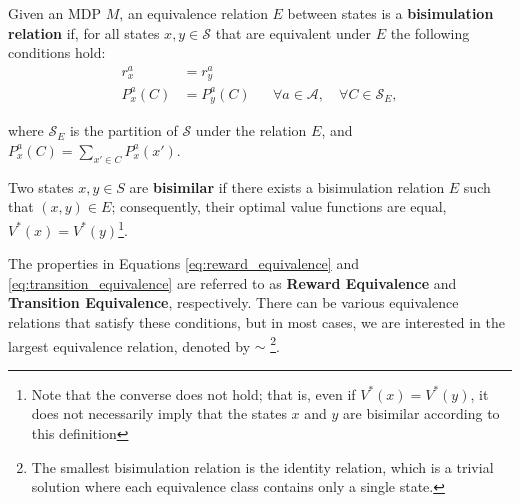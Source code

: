 \begin{definition}
Given an MDP $M$, an equivalence relation $E$ between states is a \textbf{bisimulation relation} if, for all states $x, y \in \mathcal{S}$ that are equivalent under $E$ the following conditions hold:
\begin{align}
\label{eq:reward_equivalence}
r^a_x & = r^a_y \\
\label{eq:transition_equivalence}
P_x^a(C) & = P_y^a(C) & & \forall a \in \mathcal{A}, \quad \forall C \in \mathcal{S}_E,
\end{align}

where $\mathcal{S}_E$ is the partition of $\mathcal{S}$ under the relation $E$, and $P_x^a(C) = \sum_{x' \in C} P_x^a(x')$.

Two states $x, y \in S$ are \textbf{bisimilar} if there exists a bisimulation relation $E$ such that $(x, y) \in E$; consequently, their optimal value functions are equal, \(V^\ast(x) = V^\ast(y)\)\footnote{Note that the converse does not hold; that is, even if \(V^\ast(x) = V^\ast(y)\), it does not necessarily imply that the states $x$ and $y$ are bisimilar according to this definition}.

\end{definition}

The properties in Equations \ref{eq:reward_equivalence} and \ref{eq:transition_equivalence} are referred to as \textbf{Reward Equivalence} and \textbf{Transition Equivalence}, respectively. There can be various equivalence relations that satisfy these conditions, but in most cases, we are interested in the largest equivalence relation, denoted by $\sim$ \footnote{The smallest bisimulation relation is the identity relation, which is a trivial solution where each equivalence class contains only a single state.}.

